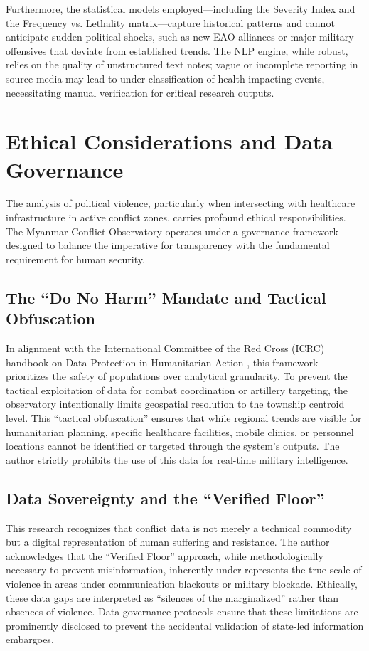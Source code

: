 \documentclass[conference]{IEEEtran}
\begin{document}
Furthermore, the statistical models employed---including the Severity Index and the Frequency vs. Lethality matrix---capture historical patterns and cannot anticipate sudden political shocks, such as new EAO alliances or major military offensives that deviate from established trends. The NLP engine, while robust, relies on the quality of unstructured text notes; vague or incomplete reporting in source media may lead to under-classification of health-impacting events, necessitating manual verification for critical research outputs.

\section{Ethical Considerations and Data Governance}

The analysis of political violence, particularly when intersecting with healthcare infrastructure in active conflict zones, carries profound ethical responsibilities. The Myanmar Conflict Observatory operates under a governance framework designed to balance the imperative for transparency with the fundamental requirement for human security.

\subsection{The ``Do No Harm'' Mandate and Tactical Obfuscation}
In alignment with the International Committee of the Red Cross (ICRC) handbook on Data Protection in Humanitarian Action \cite{icrc2020handbook}, this framework prioritizes the safety of populations over analytical granularity. To prevent the tactical exploitation of data for combat coordination or artillery targeting, the observatory intentionally limits geospatial resolution to the township centroid level. This ``tactical obfuscation'' ensures that while regional trends are visible for humanitarian planning, specific healthcare facilities, mobile clinics, or personnel locations cannot be identified or targeted through the system's outputs. The author strictly prohibits the use of this data for real-time military intelligence.

\subsection{Data Sovereignty and the ``Verified Floor''}
This research recognizes that conflict data is not merely a technical commodity but a digital representation of human suffering and resistance. The author acknowledges that the ``Verified Floor'' approach, while methodologically necessary to prevent misinformation, inherently under-represents the true scale of violence in areas under communication blackouts or military blockade. Ethically, these data gaps are interpreted as ``silences of the marginalized'' rather than absences of violence. Data governance protocols ensure that these limitations are prominently disclosed to prevent the accidental validation of state-led information embargoes.
\end{document}
